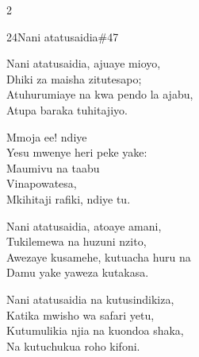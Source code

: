 \begin{multicols}{2}
\begin{hymn}{24}{Nani atatusaidia}{\#47}
\begin{stanza}
Nani atatusaidia, ajuaye mioyo,\\
Dhiki za maisha zitutesapo;\\
Atuhurumiaye na kwa pendo la ajabu,\\
Atupa baraka tuhitajiyo.
\end{stanza}
\begin{chorus}
Mmoja ee! ndiye\\
Yesu mwenye heri peke yake:\\
Maumivu na taabu\\
Vinapowatesa,\\
Mkihitaji rafiki, ndiye tu.
\end{chorus}
\begin{stanza}
Nani atatusaidia, atoaye amani,\\
Tukilemewa na huzuni nzito,\\
Awezaye kusamehe, kutuacha huru na\\
Damu yake yaweza kutakasa.
\end{stanza}
\begin{stanza}
Nani atatusaidia na kutusindikiza,\\
Katika mwisho wa safari yetu,\\
Kutumulikia njia na kuondoa shaka,\\
Na kutuchukua roho kifoni.
\end{stanza}
\end{hymn}


\end{multicols}
